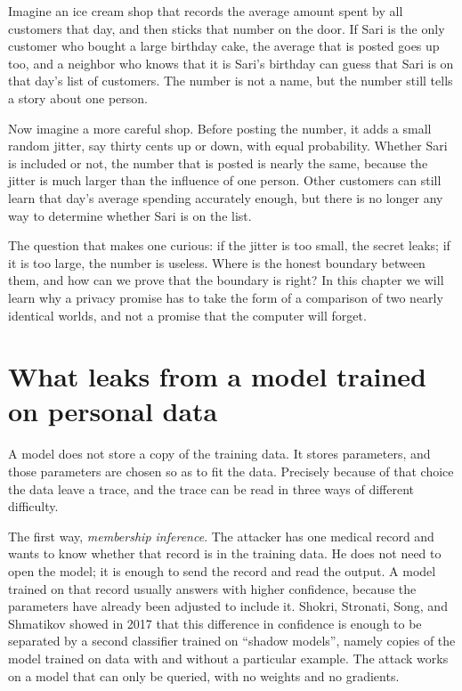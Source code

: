 \begin{untukanak}
Imagine an ice cream shop that records the average amount spent by all customers that
day, and then sticks that number on the door. If Sari is the only customer who bought a
large birthday cake, the average that is posted goes up too, and a neighbor who knows
that it is Sari's birthday can guess that Sari is on that day's list of customers. The
number is not a name, but the number still tells a story about one person.

Now imagine a more careful shop. Before posting the number, it adds a small random
jitter, say thirty cents up or down, with equal probability. Whether Sari is included or
not, the number that is posted is nearly the same, because the jitter is much larger
than the influence of one person. Other customers can still learn that day's average
spending accurately enough, but there is no longer any way to determine whether Sari is
on the list.

The question that makes one curious: if the jitter is too small, the secret leaks; if
it is too large, the number is useless. Where is the honest boundary between them, and
how can we prove that the boundary is right? In this chapter we will learn why a privacy
promise has to take the form of a comparison of two nearly identical worlds, and not a
promise that the computer will forget.
\end{untukanak}

\section{What leaks from a model trained on personal data}

A model does not store a copy of the training data. It stores parameters, and those
parameters are chosen so as to fit the data. Precisely because of that choice the data
leave a trace, and the trace can be read in three ways of different difficulty.

The first way, \emph{membership inference}. The attacker has one medical record and
wants to know whether that record is in the training data. He does not need to open the
model; it is enough to send the record and read the output. A model trained on that
record usually answers with higher confidence, because the parameters have already been
adjusted to include it. Shokri, Stronati, Song, and Shmatikov showed in 2017 that this
difference in confidence is enough to be separated by a second classifier trained on
``shadow models'', namely copies of the model trained on data with and without a
particular example. The attack works on a model that can only be queried, with no
weights and no gradients.

